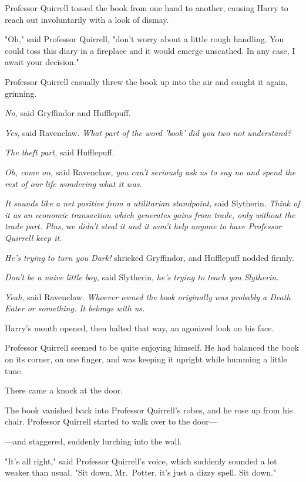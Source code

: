 Professor Quirrell tossed the book from one hand to another, causing Harry to 
reach out involuntarily with a look of dismay.

"Oh," said Professor Quirrell, "don't worry about a little rough handling. You 
could toss this diary in a fireplace and it would emerge unscathed. In any 
case, I await your decision."

Professor Quirrell casually threw the book up into the air and caught it again, 
grinning.

\emph{No,} said Gryffindor and Hufflepuff.

\emph{Yes}, said Ravenclaw. \emph{What part of the word 'book' did you two not 
understand?}

\emph{The theft part,} said Hufflepuff.

\emph{Oh, come on,} said Ravenclaw, \emph{you can't seriously ask us to say no 
and spend the rest of our life wondering what it was.}

\emph{It sounds like a net positive from a utilitarian standpoint,} said 
Slytherin. \emph{Think of it as an economic transaction which generates gains 
from trade, only without the trade part. Plus,} we \emph{didn't steal it and it 
won't help anyone to have Professor Quirrell keep it.}

\emph{He's trying to turn you Dark!} shrieked Gryffindor, and Hufflepuff nodded 
firmly.

\emph{Don't be a naive little boy,} said Slytherin, \emph{he's trying to teach 
you Slytherin.}

\emph{Yeah,} said Ravenclaw. \emph{Whoever owned the book originally was 
probably a Death Eater or something. It belongs with us.\\
}

Harry's mouth opened, then halted that way, an agonized look on his face.

Professor Quirrell seemed to be quite enjoying himself. He had balanced the 
book on its corner, on one finger, and was keeping it upright while humming a 
little tune.

There came a knock at the door.

The book vanished back into Professor Quirrell's robes, and he rose up from his 
chair. Professor Quirrell started to walk over to the door---

---and staggered, suddenly lurching into the wall.

"It's all right," said Professor Quirrell's voice, which suddenly sounded a lot 
weaker than usual. "Sit down, Mr.~Potter, it's just a dizzy spell. Sit down."

